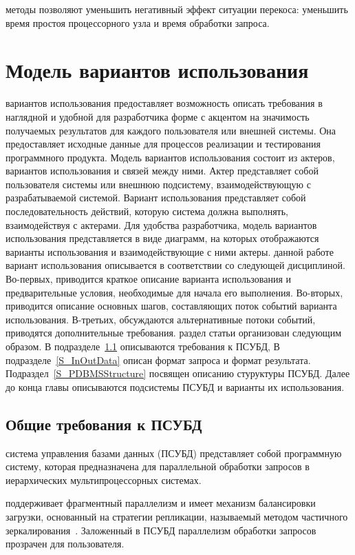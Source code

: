 \documentclass[11pt,oneside]{article}
\begin{document}
	 методы позволяют уменьшить негативный эффект ситуации перекоса: уменьшить время простоя процессорного узла и время обработки запроса.
	
	\section{Модель вариантов использования}\label{S_UseCaseModel}
	 вариантов использования предоставляет возможность описать требования в наглядной и удобной для разработчика форме с акцентом на значимость получаемых результатов для каждого пользователя или внешней системы. Она предоставляет исходные данные для процессов реализации и тестирования программного продукта. Модель вариантов использования состоит из актеров, вариантов использования и связей между ними. Актер представляет собой пользователя системы или внешнюю подсистему, взаимодействующую с разрабатываемой системой. Вариант использования представляет собой последовательность действий, которую система должна выполнять, взаимодействуя с актерами. Для удобства разработчика, модель вариантов использования представляется в виде диаграмм, на которых отображаются варианты использования и взаимодействующие с ними актеры.
	 данной работе вариант использования  описывается в соответствии со следующей дисциплиной. Во-первых, приводится краткое описание варианта использования и предварительные условия, необходимые для начала его выполнения. Во-вторых, приводится описание основных шагов, составляющих поток событий варианта использования. В-третьих, обсуждаются альтернативные потоки событий, приводятся дополнительные требования.
	 раздел статьи организован следующим образом. В подразделе~\ref{S_PDBMSRequirements} описываются требования к ПСУБД, В подразделе~\ref{S_InOutData} описан формат запроса и формат результата. Подраздел~\ref{S_PDBMSStructure} посвящен описанию стуруктуры ПСУБД. Далее до конца главы описываются подсистемы ПСУБД и варианты их использования.
	
	\subsection{Общие требования к ПСУБД}\label{S_PDBMSRequirements}
	 система управления базами данных (ПСУБД) представляет собой программную систему, которая предназначена для параллельной обработки запросов в иерархических мультипроцессорных системах.
	
	 поддерживает фрагментный параллелизм и имеет механизм балансировки загрузки, основанный на стратегии репликации, называемый методом частичного зеркалирования~\cite{B_Lepikhov2006}. Заложенный в ПСУБД параллелизм обработки запросов прозрачен для пользователя.
	
\end{document}
